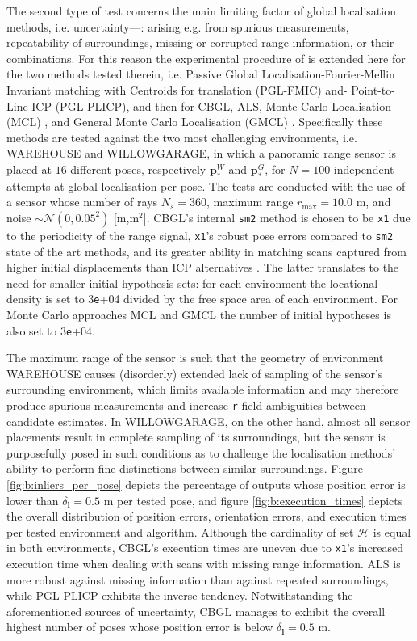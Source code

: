 The second type of test concerns the main limiting factor of global
localisation methods, i.e. uncertainty---: arising e.g. from spurious
measurements, repeatability of surroundings, missing or corrupted range
information, or their combinations. For this reason the experimental procedure
of \cite{Filotheou2022g} is extended here for the two methods tested therein,
i.e.  Passive Global Localisation-Fourier-Mellin Invariant matching with
Centroids for translation (PGL-FMIC) and- Point-to-Line ICP (PGL-PLICP), and
then for CBGL, ALS, Monte Carlo Localisation (MCL) \cite{mcl}, and
General Monte Carlo Localisation (GMCL) \cite{gmcl}. Specifically these
methods are tested against the two most challenging environments, i.e.
WAREHOUSE and WILLOWGARAGE, in which a panoramic range sensor is placed at $16$
different poses, respectively $\bm{p}_{\ast}^{W}$ and $\bm{p}_{\ast}^{G}$, for
$N = 100$ independent attempts at global localisation per pose. The tests are
conducted with the use of a sensor whose number of rays $N_s = 360$, maximum
range $r_{\max} = 10.0$ m, and noise $\sim \mathcal{N}(0, 0.05^2)$ [m,m$^2$].
CBGL's internal \texttt{sm2} method is chosen to be \texttt{x1} due to the
periodicity of the range signal, \texttt{x1}'s robust pose errors compared to
\texttt{sm2} state of the art methods, and its greater ability in matching
scans captured from higher initial displacements than ICP alternatives
\cite{Filotheou2023a}. The latter translates to the need for smaller initial
hypothesis sets: for each environment the locational density is set to
$3$\texttt{e}+04 divided by the free space area of each environment. For Monte
Carlo approaches MCL and GMCL the number of initial hypotheses is also set to
$3$\texttt{e}+04.

The maximum range of the sensor is such that the geometry of environment
WAREHOUSE causes (disorderly) extended lack of sampling of the sensor's
surrounding environment, which limits available information and may therefore
produce spurious measurements and increase \texttt{r}-field ambiguities between
candidate estimates. In WILLOWGARAGE, on the other hand, almost all sensor
placements result in complete sampling of its surroundings, but the sensor is
purposefully posed in such conditions as to challenge the localisation methods'
ability to perform fine distinctions between similar surroundings. Figure
\ref{fig:b:inliers_per_pose} depicts the percentage of outputs whose position
error is lower than $\delta_{\bm{l}} = 0.5$ m per tested pose, and figure
\ref{fig:b:execution_times} depicts the overall distribution of position errors,
orientation errors, and execution times
per tested environment and algorithm. Although the cardinality of set
$\mathcal{H}$ is equal in both environments, CBGL's execution times are uneven
due to \texttt{x1}'s increased execution time when dealing with scans with
missing range information. ALS is more robust against missing information
than against repeated surroundings, while PGL-PLICP exhibits the inverse
tendency. Notwithstanding the aforementioned sources of uncertainty, CBGL
manages to exhibit the overall highest number of poses whose position error is
below $\delta_{\bm{l}} = 0.5$ m.

